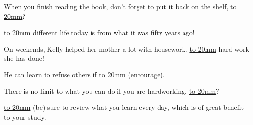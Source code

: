 \item {
    When you finish reading the book, don't forget to put it back on the shelf, \underline{\hbox to 20mm{}}?
} 
\item {
    \underline{\hbox to 20mm{}} different life today is from what it was fifty years ago!
} 
\item {
    On weekends, Kelly helped her mother a lot with housework. \underline{\hbox to 20mm{}} hard work she has done!
} 
\item {
    He can learn to refuse others if \underline{\hbox to 20mm{}} (encourage).
} 
\item {
    There is no limit to what you can do if you are hardworking,  \underline{\hbox to 20mm{}}?
} 
\item {
    \underline{\hbox to 20mm{}} (be) sure to review what you learn every day, which is of great benefit to your study.
} 